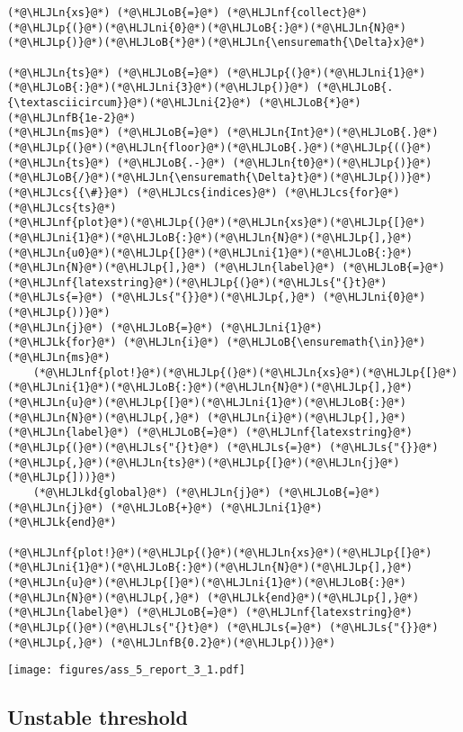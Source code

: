 \documentclass[12pt,a4paper]{article}
\newcommand{\HLJLk}[1]{\textcolor[RGB]{148,91,176}{\textbf{#1}}}
\newcommand{\HLJLkd}[1]{\textcolor[RGB]{214,102,97}{\textit{#1}}}
\newcommand{\HLJLn}[1]{#1}
\newcommand{\HLJLnf}[1]{\textcolor[RGB]{66,102,213}{#1}}
\newcommand{\HLJLs}[1]{\textcolor[RGB]{201,61,57}{#1}}
\newcommand{\HLJLnfB}[1]{\textcolor[RGB]{59,151,46}{#1}}
\newcommand{\HLJLni}[1]{\textcolor[RGB]{59,151,46}{#1}}
\newcommand{\HLJLoB}[1]{\textcolor[RGB]{102,102,102}{\textbf{#1}}}
\newcommand{\HLJLp}[1]{#1}
\newcommand{\HLJLcs}[1]{\textcolor[RGB]{153,153,119}{\textit{#1}}}
\begin{document}
\begin{lstlisting}
(*@\HLJLn{xs}@*) (*@\HLJLoB{=}@*) (*@\HLJLnf{collect}@*)(*@\HLJLp{(}@*)(*@\HLJLni{0}@*)(*@\HLJLoB{:}@*)(*@\HLJLn{N}@*)(*@\HLJLp{)}@*)(*@\HLJLoB{*}@*)(*@\HLJLn{\ensuremath{\Delta}x}@*)

(*@\HLJLn{ts}@*) (*@\HLJLoB{=}@*) (*@\HLJLp{(}@*)(*@\HLJLni{1}@*)(*@\HLJLoB{:}@*)(*@\HLJLni{3}@*)(*@\HLJLp{)}@*) (*@\HLJLoB{.{\textasciicircum}}@*)(*@\HLJLni{2}@*) (*@\HLJLoB{*}@*) (*@\HLJLnfB{1e-2}@*)
(*@\HLJLn{ms}@*) (*@\HLJLoB{=}@*) (*@\HLJLn{Int}@*)(*@\HLJLoB{.}@*)(*@\HLJLp{(}@*)(*@\HLJLn{floor}@*)(*@\HLJLoB{.}@*)(*@\HLJLp{((}@*)(*@\HLJLn{ts}@*) (*@\HLJLoB{.-}@*) (*@\HLJLn{t0}@*)(*@\HLJLp{)}@*)(*@\HLJLoB{/}@*)(*@\HLJLn{\ensuremath{\Delta}t}@*)(*@\HLJLp{))}@*)(*@\HLJLcs{{\#}}@*) (*@\HLJLcs{indices}@*) (*@\HLJLcs{for}@*) (*@\HLJLcs{ts}@*)
(*@\HLJLnf{plot}@*)(*@\HLJLp{(}@*)(*@\HLJLn{xs}@*)(*@\HLJLp{[}@*)(*@\HLJLni{1}@*)(*@\HLJLoB{:}@*)(*@\HLJLn{N}@*)(*@\HLJLp{],}@*) (*@\HLJLn{u0}@*)(*@\HLJLp{[}@*)(*@\HLJLni{1}@*)(*@\HLJLoB{:}@*)(*@\HLJLn{N}@*)(*@\HLJLp{],}@*) (*@\HLJLn{label}@*) (*@\HLJLoB{=}@*) (*@\HLJLnf{latexstring}@*)(*@\HLJLp{(}@*)(*@\HLJLs{"{}t}@*) (*@\HLJLs{=}@*) (*@\HLJLs{"{}}@*)(*@\HLJLp{,}@*) (*@\HLJLni{0}@*) (*@\HLJLp{))}@*)
(*@\HLJLn{j}@*) (*@\HLJLoB{=}@*) (*@\HLJLni{1}@*)
(*@\HLJLk{for}@*) (*@\HLJLn{i}@*) (*@\HLJLoB{\ensuremath{\in}}@*) (*@\HLJLn{ms}@*)
    (*@\HLJLnf{plot!}@*)(*@\HLJLp{(}@*)(*@\HLJLn{xs}@*)(*@\HLJLp{[}@*)(*@\HLJLni{1}@*)(*@\HLJLoB{:}@*)(*@\HLJLn{N}@*)(*@\HLJLp{],}@*) (*@\HLJLn{u}@*)(*@\HLJLp{[}@*)(*@\HLJLni{1}@*)(*@\HLJLoB{:}@*)(*@\HLJLn{N}@*)(*@\HLJLp{,}@*) (*@\HLJLn{i}@*)(*@\HLJLp{],}@*) (*@\HLJLn{label}@*) (*@\HLJLoB{=}@*) (*@\HLJLnf{latexstring}@*)(*@\HLJLp{(}@*)(*@\HLJLs{"{}t}@*) (*@\HLJLs{=}@*) (*@\HLJLs{"{}}@*)(*@\HLJLp{,}@*)(*@\HLJLn{ts}@*)(*@\HLJLp{[}@*)(*@\HLJLn{j}@*)(*@\HLJLp{]))}@*)
    (*@\HLJLkd{global}@*) (*@\HLJLn{j}@*) (*@\HLJLoB{=}@*) (*@\HLJLn{j}@*) (*@\HLJLoB{+}@*) (*@\HLJLni{1}@*)
(*@\HLJLk{end}@*)

(*@\HLJLnf{plot!}@*)(*@\HLJLp{(}@*)(*@\HLJLn{xs}@*)(*@\HLJLp{[}@*)(*@\HLJLni{1}@*)(*@\HLJLoB{:}@*)(*@\HLJLn{N}@*)(*@\HLJLp{],}@*) (*@\HLJLn{u}@*)(*@\HLJLp{[}@*)(*@\HLJLni{1}@*)(*@\HLJLoB{:}@*)(*@\HLJLn{N}@*)(*@\HLJLp{,}@*) (*@\HLJLk{end}@*)(*@\HLJLp{],}@*) (*@\HLJLn{label}@*) (*@\HLJLoB{=}@*) (*@\HLJLnf{latexstring}@*)(*@\HLJLp{(}@*)(*@\HLJLs{"{}t}@*) (*@\HLJLs{=}@*) (*@\HLJLs{"{}}@*)(*@\HLJLp{,}@*) (*@\HLJLnfB{0.2}@*)(*@\HLJLp{))}@*)
\end{lstlisting}

\texttt{[image: figures/ass\_5\_report\_3\_1.pdf]}

\subsection{Unstable threshold}
\end{document}
